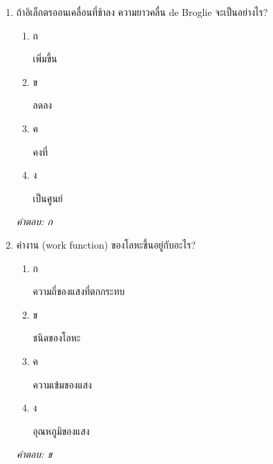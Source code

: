 \documentclass[12pt]{article}
\begin{document}
\begin{enumerate}[label=\arabic*., itemsep=0.5\baselineskip, topsep=0.5\baselineskip, leftmargin=*]
\item ถ้าอิเล็กตรออนเคลื่อนที่ช้าลง ความยาวคลื่น de Broglie จะเป็นอย่างไร?
\begin{enumerate}[label=\alph*)., itemsep=0.3\baselineskip, topsep=0.3\baselineskip]
\item ก\ 
\begin{minipage}[t]{0.9\linewidth}
\raggedright เพิ่มขึ้น
\end{minipage}
\item ข\ 
\begin{minipage}[t]{0.9\linewidth}
\raggedright ลดลง
\end{minipage}
\item ค\ 
\begin{minipage}[t]{0.9\linewidth}
\raggedright คงที่
\end{minipage}
\item ง\ 
\begin{minipage}[t]{0.9\linewidth}
\raggedright เป็นศูนย์
\end{minipage}
\end{enumerate}
\vspace{-0.3\baselineskip}
\begin{small}
\textit{คำตอบ: ก}
\end{small}

\item ค่างาน (work function) ของโลหะขึ้นอยู่กับอะไร?
\begin{enumerate}[label=\alph*)., itemsep=0.3\baselineskip, topsep=0.3\baselineskip]
\item ก\ 
\begin{minipage}[t]{0.9\linewidth}
\raggedright ความถี่ของแสงที่ตกกระทบ
\end{minipage}
\item ข\ 
\begin{minipage}[t]{0.9\linewidth}
\raggedright ชนิดของโลหะ
\end{minipage}
\item ค\ 
\begin{minipage}[t]{0.9\linewidth}
\raggedright ความเข้มของแสง
\end{minipage}
\item ง\ 
\begin{minipage}[t]{0.9\linewidth}
\raggedright อุณหภูมิของแสง
\end{minipage}
\end{enumerate}
\vspace{-0.3\baselineskip}
\begin{small}
\textit{คำตอบ: ข}
\end{small}


\end{enumerate}
\end{document}
